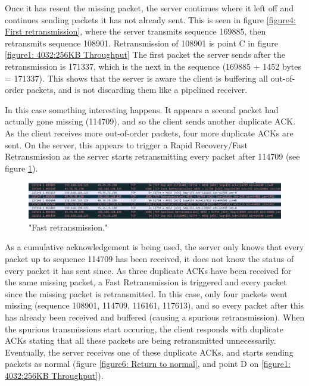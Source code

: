 \documentclass[12pt]{article}
\begin{document}
Once it has resent the missing packet, the server continues where it left off and continues sending packets it has not already sent.
This is seen in figure \ref{figure4: First retransmission}, where the server transmits sequence 169885, then retransmits sequence 108901.
Retransmission of 108901 is point C in figure \ref{figure1: 4032:256KB Throughput}
The first packet the server sends after the retransmission is 171337, which is the next in the sequence (169885 + 1452 bytes = 171337).
This shows that the server is aware the client is buffering all out-of-order packets, and is not discarding them like a pipelined receiver.

In this case something interesting happens.
It appears a second packet had actually gone missing (114709), and so the client sends another duplicate ACK.
As the client receives more out-of-order packets, four more duplicate ACKs are sent.
On the server, this appears to trigger a Rapid Recovery/Fast Retransmission as the server starts retransmitting every packet after 114709 (see figure \ref{figure5: Fast retransmission}).

\begin{figure}[!htbp]
  \centering
  \includegraphics[width=\linewidth]{4032-256KB-fast-retransmission.PNG}
  \caption{"Fast retransmission."}
  \label{figure5: Fast retransmission}
\end{figure}

As a cumulative acknowledgement is being used, the server only knows that every packet up to sequence 114709 has been received, it does not know the status of every packet it has sent since.
As three duplicate ACKs have been received for the same missing packet, a Fast Retransmission is triggered and every packet since the missing packet is retransmitted.
In this case, only four packets went missing (sequence 108901, 114709, 116161, 117613), and so every packet after this has already been received and buffered (causing a spurious retransmission).
When the spurious transmissions start occuring, the client responds with duplicate ACKs stating that all these packets are being retransmitted unnecessarily.
Eventually, the server receives one of these duplicate ACKs, and starts sending packets as normal (figure \ref{figure6: Return to normal}, and point D on \ref{figure1: 4032:256KB Throughput}).
\end{document}
